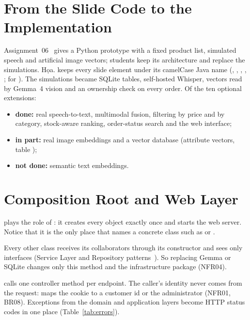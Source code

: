 \section{From the Slide Code to the Implementation}\label{sec:5.4}

Assignment~06~\cite{slidesA06} gives a Python prototype with a fixed product list, simulated speech and artificial
image vectors; students keep its architecture and replace the simulations. Họa. keeps every slide element under its
camelCase Java name (, ,
, , ;
 for ). The simulations became SQLite tables, self-hosted Whisper, vectors
read by Gemma~4 vision and an ownership check on every order. Of the ten optional extensions:
\begin{itemize}
\item \textbf{done:} real speech-to-text, multimodal fusion, filtering by price and by category, stock-aware ranking,
      order-status search and the web interface;
\item \textbf{in part:} real image embeddings and a vector database (attribute vectors, table );
\item \textbf{not done:} semantic text embeddings.
\end{itemize}

\section{Composition Root and Web Layer}\label{sec:5.5}

 plays the role of : it creates every object exactly once and starts the
web server. Notice that it is the only place that names a concrete class such as  or
.


Every other class receives its collaborators through its constructor and sees only interfaces (Service Layer and
Repository patterns~\cite{fowler,slidesL05}). So replacing Gemma or SQLite changes only this method and the
infrastructure package (NFR04).

 calls one controller method per endpoint. The caller's identity never comes from the request:
 maps the cookie  to a customer id or the administrator (NFR01, BR08).
Exceptions from the domain and application layers become HTTP status codes in one place (Table~\ref{tab:errors}).

